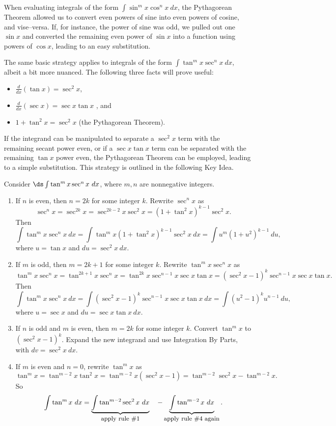 When evaluating integrals of the form $\int \sin^mx\cos^nx\ dx$, the Pythagorean Theorem allowed us to convert even powers of sine into even powers of cosine, and vise--versa. If, for instance, the power of sine was odd, we pulled out one $\sin x$ and converted the remaining even power of $\sin x$ into a function using powers of $\cos x$, leading to an easy substitution.

The same basic strategy applies to integrals of the form $\int \tan^mx\sec^n x\ dx$, albeit a bit more nuanced. The following three facts will prove useful:
\begin{itemize}
\item $\frac{d}{dx}(\tan x) = \sec^2x$, 
\item $\frac{d}{dx}(\sec x) = \sec x\tan x$ , and 
\item	$1+\tan^2x = \sec^2x$ (the Pythagorean Theorem).
\end{itemize}

If the integrand can be manipulated to separate a $\sec^2x$ term with the remaining secant power even, or if a $\sec x\tan x$ term can be separated with the remaining $\tan x$ power even, the Pythagorean Theorem can be employed, leading to a simple substitution. This strategy is outlined in the following Key Idea.

\setboxwidth{130pt}
{Consider $\ds\int\tan^mx\sec^nx\ dx$, where $m,n$ are nonnegative integers.
\begin{enumerate}
\item		If $n$ is even, then $n=2k$ for some integer $k$. Rewrite $\sec^nx$ as 
$$\sec^nx = \sec^{2k}x = \sec^{2k-2}x\sec^2x = (1+\tan^2x)^{k-1}\sec^2x.$$
Then
$$\int\tan^mx\sec^nx\ dx=\int\tan^mx(1+\tan^2x)^{k-1}\sec^2x\ dx = \int u^m(1+u^2)^{k-1}\ du,$$
where $u = \tan x$ and $du = \sec^2x\ dx$.

\item		If $m$ is odd, then $m=2k+1$ for some integer $k$. Rewrite $\tan^mx\sec^nx$ as
$$\tan^mx\sec^nx = \tan^{2k+1}x\sec^nx = \tan^{2k}x\sec^{n-1}x\sec x\tan x = (\sec^2x-1)^k\sec^{n-1}x\sec x\tan x.$$
Then
$$\int\tan^mx\sec^nx\ dx=\int(\sec^2x-1)^k\sec^{n-1}x\sec x\tan x\ dx = \int(u^2-1)^ku^{n-1}\ du,$$
where $u = \sec x$ and $du = \sec x\tan x\ dx$.

\item If $n$ is odd and $m$ is even, then $m=2k$ for some integer $k$. Convert $\tan^mx $ to $(\sec^2x-1)^k$. Expand the new integrand and use Integration By Parts, with $dv = \sec^2x\ dx$.

\item		If $m$ is even and $n=0$, rewrite $\tan^mx$ as
$$\tan^mx = \tan^{m-2}x\tan^2x = \tan^{m-2}x(\sec^2x-1) = \tan^{m-2}\sec^2x-\tan^{m-2}x.$$
So
$$\int\tan^mx\ dx = \underbrace{\int\tan^{m-2}\sec^2x\ dx}_{\text{\small apply rule \#1}}\quad - \underbrace{\int\tan^{m-2}x\ dx}_{\text{\small apply rule \#4 again}}.$$

\end{enumerate}}

